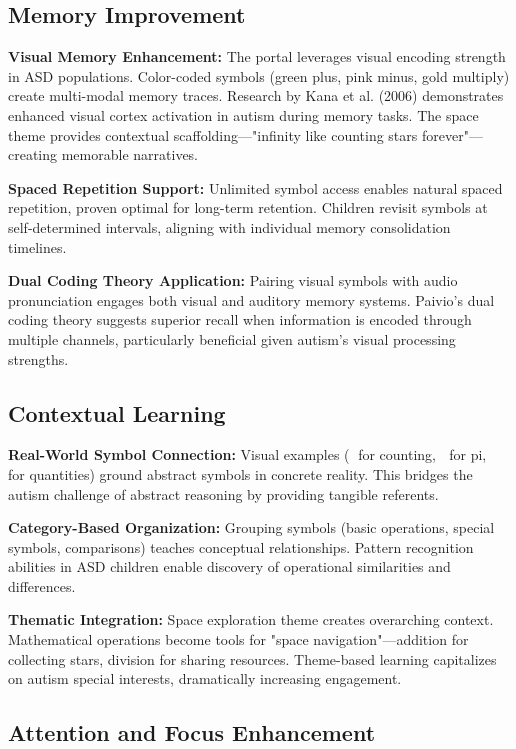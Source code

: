 \documentclass[11pt, a4paper]{article}
\begin{document}
\subsection{Memory Improvement}

\textbf{Visual Memory Enhancement:} The portal leverages visual encoding strength in ASD populations. Color-coded symbols (green plus, pink minus, gold multiply) create multi-modal memory traces. Research by Kana et al. (2006) demonstrates enhanced visual cortex activation in autism during memory tasks. The space theme provides contextual scaffolding—"infinity like counting stars forever"—creating memorable narratives.

\textbf{Spaced Repetition Support:} Unlimited symbol access enables natural spaced repetition, proven optimal for long-term retention. Children revisit symbols at self-determined intervals, aligning with individual memory consolidation timelines.

\textbf{Dual Coding Theory Application:} Pairing visual symbols with audio pronunciation engages both visual and auditory memory systems. Paivio's dual coding theory suggests superior recall when information is encoded through multiple channels, particularly beneficial given autism's visual processing strengths.

\subsection{Contextual Learning}

\textbf{Real-World Symbol Connection:} Visual examples (🍎 for counting, 🍕 for pi, 🌟 for quantities) ground abstract symbols in concrete reality. This bridges the autism challenge of abstract reasoning by providing tangible referents.

\textbf{Category-Based Organization:} Grouping symbols (basic operations, special symbols, comparisons) teaches conceptual relationships. Pattern recognition abilities in ASD children enable discovery of operational similarities and differences.

\textbf{Thematic Integration:} Space exploration theme creates overarching context. Mathematical operations become tools for "space navigation"—addition for collecting stars, division for sharing resources. Theme-based learning capitalizes on autism special interests, dramatically increasing engagement.

\subsection{Attention and Focus Enhancement}
\end{document}
